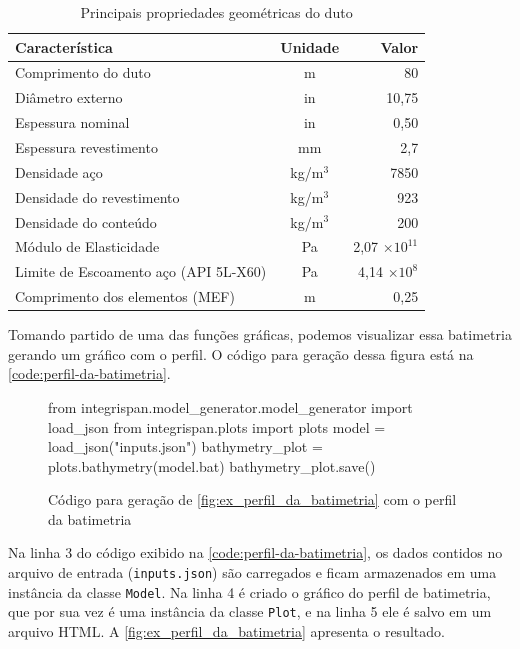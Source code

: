 \begin{table}[ht]
	\renewcommand{\arraystretch}{1.2}
		\small
		\centering
		\caption{\label{tab:propriedades} Principais propriedades geométricas do duto}
		\begin{tabular}{lcr}
			\toprule
			Característica & Unidade & Valor\\
			\midrule
			Comprimento do duto &  m & 80\\
			Diâmetro externo &  in & 10,75\\
			Espessura nominal &  in & 0,50\\
			Espessura revestimento &  mm & 2,7\\
			Densidade aço & kg/m$^3$ & 7850\\
			Densidade do revestimento & kg/m$^3$ & 923\\
			Densidade do conteúdo & kg/m$^3$ & 200\\
			Módulo de Elasticidade & Pa & 2,07 $\times 10^{11}$\\
			Limite de Escoamento aço (API 5L-X60) & Pa & 4,14 $\times 10^8$\\
			Comprimento dos elementos (MEF) & m & 0,25\\
			\bottomrule
		\end{tabular}
\end{table}

Tomando partido de uma das funções gráficas, podemos visualizar essa batimetria gerando um gráfico com o perfil. O código para geração dessa figura está na \autoref{code:perfil-da-batimetria}.


\begin{figure}
\caption{Código para geração de \autoref{fig:ex_perfil_da_batimetria} com o perfil da batimetria}\label{code:perfil-da-batimetria}
\begin{pythoncode}
from integrispan.model_generator.model_generator import load_json
from integrispan.plots import plots
model = load_json("inputs.json")
bathymetry_plot = plots.bathymetry(model.bat)
bathymetry_plot.save()
\end{pythoncode}
\end{figure}


Na linha 3 do código exibido na \autoref{code:perfil-da-batimetria}, os dados contidos no arquivo de entrada (\texttt{inputs.json}) são carregados e ficam armazenados em uma instância da classe \texttt{Model}. Na linha 4 é criado o gráfico do perfil de batimetria, que por sua vez é uma instância da classe \texttt{Plot}, e na linha 5 ele é salvo em um arquivo HTML. A \autoref{fig:ex_perfil_da_batimetria} apresenta o resultado.


